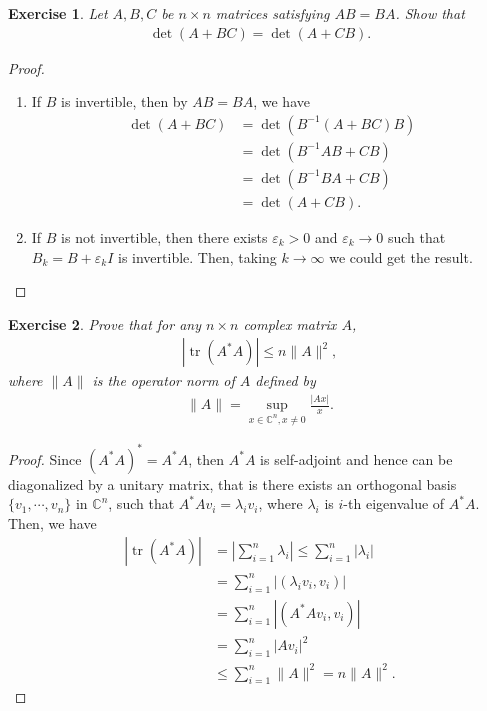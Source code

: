 \documentclass[11pt]{article}
\newtheorem{exercise}{Exercise}[section]
\theoremstyle{definition}
\numberwithin{equation}{subsection}
\begin{document}
\medskip

\begin{exercise}
Let $A, B, C$ be $n \times n$ matrices satisfying $AB = BA$. Show that
\begin{align*}
    \det (A + BC) = \det (A + CB).
\end{align*}
\end{exercise}
\begin{proof}
~\begin{enumerate}[label=(\alph*)]
    \item If $B$ is invertible, then by $AB = BA$, we have
    \begin{align*}
        \det (A + BC) & = \det \left(B^{-1}(A + BC)B\right) \\
        & = \det \left(B^{-1}AB + CB\right) \\
        & = \det \left(B^{-1}BA + CB\right) \\
        & = \det \left(A + CB\right).
    \end{align*}
    
    \item If $B$ is not invertible, then there exists $\varepsilon_k > 0$ and $\varepsilon_k \to 0$ such that $B_k = B + \varepsilon_k I$ is invertible. Then, taking $k \to \infty$ we could get the result.
\end{enumerate}
\end{proof}

\medskip

\begin{exercise}{\rm *}
Prove that for any $n \times n$ complex matrix $A$, 
\begin{align*}
    \left|\operatorname{tr}(A^*A) \right| \leq n \|A\|^2,
\end{align*}
where $\|A\|$ is the operator norm of $A$ defined by
\begin{align*}
    \|A\| = \sup_{x \in \mathbb{C}^n, x \neq 0} \frac{|Ax|}{x}.
\end{align*}
\end{exercise}
\begin{proof}
Since $(A^*A)^* = A^*A$, then $A^*A$ is self-adjoint and hence can be diagonalized by a unitary matrix, that is there exists an orthogonal basis $\{v_1, \cdots, v_n\}$ in $\mathbb{C}^{n}$, such that $A^*A v_i = \lambda_i v_i$, where $\lambda_i$ is $i$-th eigenvalue of $A^*A$. Then, we have
\begin{align*}
    \left|\operatorname{tr}(A^*A) \right| & = \left|\sum^n_{i=1} \lambda_i \right| \leq \sum^n_{i=1} \left|\lambda_i \right| \\
    & = \sum^n_{i=1} \left|(\lambda_i v_i, v_i) \right| \\
    & = \sum^n_{i=1} \left|(A^*A v_i, v_i) \right| \\
    & = \sum^n_{i=1} \left|Av_i \right|^2 \\
    & \leq \sum^n_{i=1} \|A\|^2 = n \|A\|^2.
\end{align*}
\end{proof}
\end{document}
